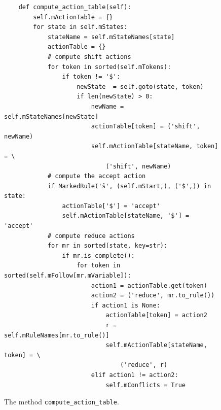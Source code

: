 \begin{figure}[!ht]
\centering
\begin{verbatim}
    def compute_action_table(self):
        self.mActionTable = {}
        for state in self.mStates:
            stateName = self.mStateNames[state]
            actionTable = {}
            # compute shift actions
            for token in sorted(self.mTokens):
                if token != '$':
                    newState  = self.goto(state, token)
                    if len(newState) > 0:
                        newName = self.mStateNames[newState]
                        actionTable[token] = ('shift', newName)
                        self.mActionTable[stateName, token] = \
                            ('shift', newName)
            # compute the accept action
            if MarkedRule('ŝ', (self.mStart,), ('$',)) in state:
                actionTable['$'] = 'accept'
                self.mActionTable[stateName, '$'] = 'accept'
            # compute reduce actions
            for mr in sorted(state, key=str):
                if mr.is_complete():
                    for token in sorted(self.mFollow[mr.mVariable]):
                        action1 = actionTable.get(token)
                        action2 = ('reduce', mr.to_rule())
                        if action1 is None:
                            actionTable[token] = action2
                            r = self.mRuleNames[mr.to_rule()]
                            self.mActionTable[stateName, token] = \
                                ('reduce', r)
                        elif action1 != action2:
                            self.mConflicts = True
\end{verbatim}
\vspace*{-0.3cm}
\caption{The method \texttt{compute\_action\_table}.}
\label{fig:04-SLR-Table-Generator.ipynb:compute_action_table}
\end{figure}


